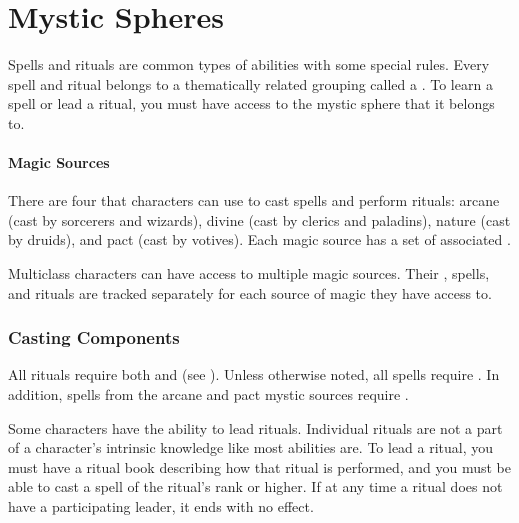 \chapter{Mystic Spheres}\label{Mystic Spheres}

  Spells and rituals are common types of \magical abilities with some special rules.
  Every spell and ritual belongs to a thematically related grouping called a .
  To learn a spell or lead a ritual, you must have access to the mystic sphere that it belongs to.

  \subsubsection{Magic Sources}
    There are four  that characters can use to cast spells and perform rituals: arcane (cast by sorcerers and wizards), divine (cast by clerics and paladins), nature (cast by druids), and pact (cast by votives).
    Each magic source has a set of associated .

    Multiclass characters can have access to multiple magic sources.
    Their , spells, and rituals are tracked separately for each source of magic they have access to.

  \subsection{Casting Components}\label{Casting Components}
    All rituals require both  and  (see ).
    Unless otherwise noted, all spells require .
    In addition, spells from the arcane and pact mystic sources require .

    Some characters have the ability to lead rituals.
    Individual rituals are not a part of a character's intrinsic knowledge like most abilities are.
    To lead a ritual, you must have a ritual book describing how that ritual is performed, and you must be able to cast a spell of the ritual's rank or higher.
    If at any time a ritual does not have a participating leader, it ends with no effect.

